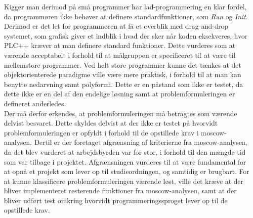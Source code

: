 \noindent Kigger man derimod på små programmer har \gls{lad}-programmering en klar fordel, da programmøren ikke behøver at definere standardfunktioner, som \textit{Run} og \textit{Init}. Derimod er det let for programmøren at få et overblik med drag-and-drop systemet, som grafisk giver et indblik i hvad der sker når koden eksekveres, hvor PLC++ kræver at man definere standard funktioner.
Dette vurderes som at værende acceptabelt i forhold til at målgruppen er specificeret til at være til mellemstore programmer.
Ved helt store programmer kunne det tænkes at det objektorienterede paradigme ville være mere praktisk, i forhold til at man kan benytte nedarvning samt polyformi. Dette er en påstand som ikke er testet, da dette ikke er en del af den endelige løsning samt at problemformuleringen er defineret anderledes.\\

\noindent Der må derfor erkendes, at problemformuleringen må betragtes som værende delvist besvaret.
Dette skyldes delvist at der ikke er testet på hvorvidt problemformuleringen er opfyldt i forhold til de opstillede krav i \gls{moscow}-analysen.
Dertil er der foretaget afgrænsning af kriterierne fra \gls{moscow}-analysen, da det blev vurderet at arbejdsbyrden var for stor, i forhold til den mængde tid som var tilbage i projektet.
Afgrænsningen vurderes til at være fundamental for at opnå et projekt som lever op til studieordningen, og samtidig er brugbart.
For at kunne klassificere problemformuleringen værende løst, ville det kræve at der bliver implementeret resterende funktioner fra \gls{moscow}-analysen, samt at der bliver udført test omkring hvorvidt programmeringssproget lever op til de opstillede krav.